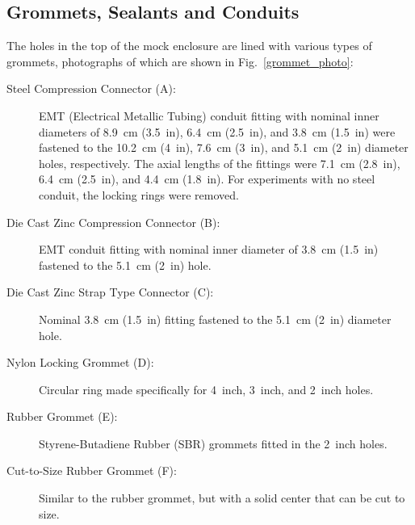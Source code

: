 \FloatBarrier

\subsection{Grommets, Sealants and Conduits}

The holes in the top of the mock enclosure are lined with various types of grommets, photographs of which are shown in Fig.~\ref{grommet_photo}:
\begin{description}
\item[Steel Compression Connector (A):] EMT (Electrical Metallic Tubing) conduit fitting with nominal inner diameters of 8.9~cm (3.5~in), 6.4~cm (2.5~in), and 3.8~cm (1.5~in) were fastened to the 10.2~cm (4~in), 7.6~cm (3~in), and 5.1~cm (2~in) diameter holes, respectively. The axial lengths of the fittings were 7.1~cm (2.8~in), 6.4~cm (2.5~in), and 4.4~cm (1.8~in). For experiments with no steel conduit, the locking rings were removed.
\item[Die Cast Zinc Compression Connector (B):] EMT conduit fitting with nominal inner diameter of 3.8~cm (1.5~in) fastened to the 5.1~cm (2~in) hole.
\item[Die Cast Zinc Strap Type Connector (C):] Nominal 3.8~cm (1.5~in) fitting fastened to the 5.1~cm (2~in) diameter hole.
\item[Nylon Locking Grommet (D):] Circular ring made specifically for 4~inch, 3~inch, and 2~inch holes.
\item[Rubber Grommet (E):] Styrene-Butadiene Rubber (SBR) grommets fitted in the 2~inch holes.
\item[Cut-to-Size Rubber Grommet (F):] Similar to the rubber grommet, but with a solid center that can be cut to size.
\end{description}

